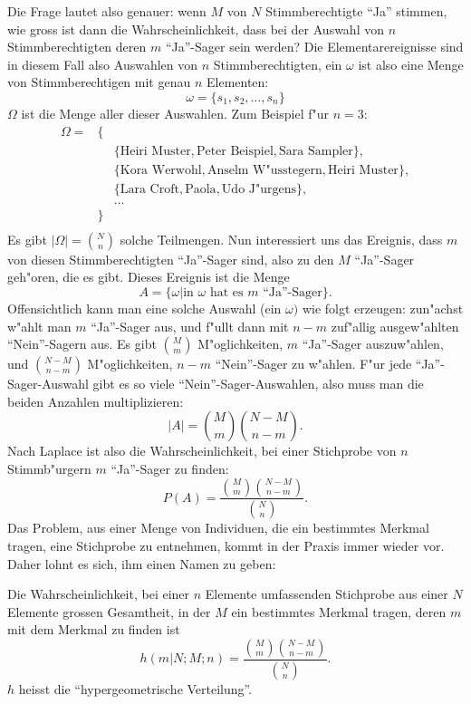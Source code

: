 Die Frage lautet also genauer: wenn $M$ von $N$ Stimmberechtigte ``Ja''
stimmen, wie gross ist dann die Wahrscheinlichkeit, dass bei der Auswahl
von $n$ Stimmberechtigten deren $m$ ``Ja''-Sager sein werden?
Die Elementarereignisse sind in diesem Fall also Auswahlen von $n$
Stimmberechtigten, ein $\omega$ ist also eine Menge von Stimmberechtigen
mit genau $n$ Elementen:
\[
\omega=\{s_1,s_2,\dots,s_n\}
\]
$\Omega$ ist die Menge aller dieser Auswahlen. Zum Beispiel f"ur $n=3$:
\begin{eqnarray*}
\Omega=&\{&\\
&&\{\text{Heiri Muster}, \text{Peter Beispiel}, \text{Sara Sampler}\},\\
&&\{\text{Kora Werwohl}, \text{Anselm W"usstegern}, \text{Heiri Muster}\},\\
&&\{\text{Lara Croft}, \text{Paola}, \text{Udo J"urgens}\},\\
&&\dots\\
&\}&\\
\end{eqnarray*}
Es gibt $|\Omega|=\binom{N}{n}$ solche Teilmengen. Nun interessiert uns das
Ereignis, dass $m$ von diesen Stimmberechtigten ``Ja''-Sager sind, also
zu den $M$ ``Ja''-Sager geh"oren, die es gibt. Dieses Ereignis ist
die Menge
\[
A=\{\omega|\text{in $\omega$ hat es $m$ ``Ja''-Sager}\}.
\]
Offensichtlich kann
man eine solche Auswahl (ein $\omega)$
wie folgt erzeugen: zun"achst w"ahlt man $m$
``Ja''-Sager aus, und f"ullt dann mit $n-m$ zuf"allig ausgew"ahlten
``Nein''-Sagern aus. Es gibt $\binom{M}{m}$ M"oglichkeiten, $m$
``Ja''-Sager auszuw"ahlen, und $\binom{N-M}{n-m}$ M"oglichkeiten, $n-m$
``Nein''-Sager zu w"ahlen. F"ur jede ``Ja''-Sager-Auswahl gibt es
so viele ``Nein''-Sager-Auswahlen, also muss man die beiden Anzahlen
multiplizieren:
\[
|A|=\binom{M}{m}\binom{N-M}{n-m}.
\]
Nach Laplace ist also die Wahrscheinlichkeit, bei einer Stichprobe von
$n$ Stimmb"urgern $m$ ``Ja''-Sager zu finden:
\[
P(A)=\frac{\binom{M}{m}\binom{N-M}{n-m}}{\binom{N}{n}}.
\]
Das Problem, aus einer Menge von Individuen, die ein bestimmtes
Merkmal tragen, eine Stichprobe zu entnehmen, kommt in der Praxis immer
wieder vor. Daher lohnt es sich, ihm einen Namen zu geben:
\begin{definition}
\label{hypergeometrischeverteilung}
Die Wahrscheinlichkeit, bei einer $n$ Elemente umfassenden Stichprobe
aus einer $N$ Elemente grossen Gesamtheit, in der $M$ ein bestimmtes
Merkmal tragen, deren $m$ mit dem Merkmal zu finden ist
\[
h(m|N;M;n)=\frac{\binom{M}{m}\binom{N-M}{n-m}}{\binom{N}{n}}.
\]
$h$ heisst die ``hypergeometrische Verteilung''.
\end{definition}

